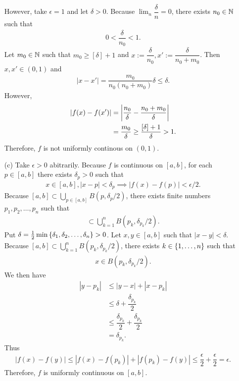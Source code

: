 \begin{problem}
\begin{solution}
\begin{itemize}
    \noindent However, take $\epsilon = 1$ and let $\delta > 0$. Because $\lim_n \dfrac{\delta}{n} = 0$, there exists $n_0 \in \N$ such that
    \begin{align*}
        0 < \dfrac{\delta}{n_0} < 1.
    \end{align*}
    Let $m_0 \in \N$ such that $m_0 \ge [\delta] + 1$ and $x := \dfrac{\delta}{n_0}, x' := \dfrac{\delta}{n_0+m_0}$. Then $x, x' \in (0,1)$ and
    \begin{align*}
        |x - x'| = \dfrac{m_0}{n_0(n_0 + m_0)} \delta \le \delta.
    \end{align*}
    However,
    \begin{align*}
        |f(x) - f(x')| &= \abs{\dfrac{n_0}{\delta} - \dfrac{n_0 + m_0}{\delta}} \\
        &= \dfrac{m_0}{\delta} \ge \dfrac{[\delta]+1}{\delta} > 1.
    \end{align*}
    Therefore, $f$ is not uniformly continous on $(0,1)$.
    \item[(c)] Take $\epsilon > 0$ abitrarily. Because $f$ is continuous on $[a,b]$, for each $p \in [a,b]$ there exists $\delta_p > 0$ such that
    \begin{align*}
        x \in [a,b], |x - p| < \delta_p \implies |f(x) - f(p)| < \epsilon/2.
    \end{align*}
    Because $[a,b] \subset \bigcup_{p \in [a,b]} B(p, \delta_p/2)$, there exists finite numbers $p_1, p_2, \ldots, p_n$ such that
    \begin{align*}
        [a,b] \subset \bigcup_{k=1}^n B(p_k, \delta_{p_k}/2).
    \end{align*}
    Put $\delta = \frac{1}{2} \min\left\{ \delta_1, \delta_2, \ldots, \delta_n\right\} > 0$. Let $x,y \in [a,b]$ such that $|x - y| < \delta$.
    Because $[a,b] \subset \bigcup_{k=1}^n B(p_k, \delta_{p_k}/2)$, there exists $k \in \left\{ 1, \ldots, n\right\}$ such that
    \begin{align*}
        x \in B(p_k, \delta_{p_k}/2).
    \end{align*}
    We then have 
    \begin{align*}
        |y - p_k| &\le |y - x| + |x - p_k| \\
        &\le \delta + \dfrac{\delta_{p_k}}{2} \\
        &\le \dfrac{\delta_{p_k}}{2} + \dfrac{\delta_{p_k}}{2} \\
        &= \delta_{p_k}.
    \end{align*}
    Thus 
    \begin{align*}
        |f(x) - f(y)| \le |f(x) - f(p_{k})| + |f(p_k) - f(y)| \le \dfrac{\epsilon}{2} + \dfrac{\epsilon}{2} = \epsilon.
    \end{align*}
    Therefore, $f$ is uniformly continuous on $[a,b]$.
\end{itemize}
\end{solution}
\end{problem}

